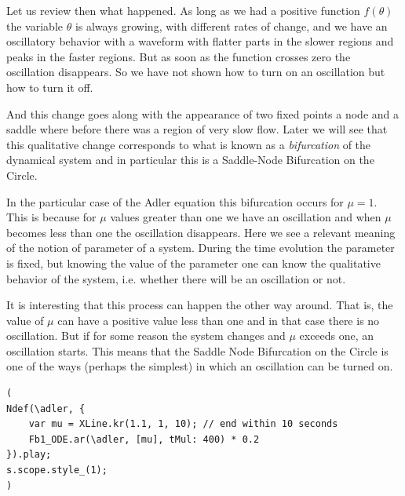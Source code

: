 \documentclass{article}
\begin{document}
Let us review then what happened. 
As long as we had a positive function $f(\theta)$ the variable $\theta$ is always growing, with different rates of change, and we have an oscillatory behavior with a waveform with flatter parts in the slower regions and peaks in the faster regions. 
But as soon as the function crosses zero the oscillation disappears. 
So we have not shown how to turn on an oscillation but how to turn it off. 

And this change goes along with the appearance of two fixed points a node and a saddle where before there was a region of very slow flow. 
Later we will see that this qualitative change corresponds to what is known as a {\em bifurcation} of the dynamical system and in particular this is a Saddle-Node Bifurcation on the Circle. 

In the particular case of the Adler equation this bifurcation occurs for $\mu=1$. 
This is because for $\mu$ values greater than one we have an oscillation and when $\mu$ becomes less than one the oscillation disappears. 
Here we see a relevant meaning of the notion of parameter of a system. 
During the time evolution the parameter is fixed, but knowing the value of the parameter one can know the qualitative behavior of the system, i.e. whether there will be an oscillation or not.

It is interesting that this process can happen the other way around. 
That is, the value of $\mu$ can have a positive value less than one and in that case there is no oscillation. But if for some reason the system changes and $\mu$ exceeds one, an oscillation starts. 
This means that the Saddle Node Bifurcation on the Circle is one of the ways (perhaps the simplest) in which an oscillation can be turned on. 


\begin{lstlisting}[frame=single,caption=The end of an oscillation.]
(
Ndef(\adler, {
	var mu = XLine.kr(1.1, 1, 10); // end within 10 seconds
	Fb1_ODE.ar(\adler, [mu], tMul: 400) * 0.2
}).play;
s.scope.style_(1);
)
\end{lstlisting}
\end{document}
